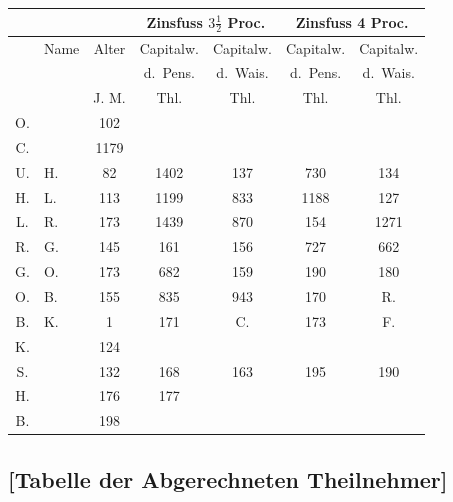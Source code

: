 \documentclass[12pt,a4paper]{article}
\begin{document}
\begin{center}
\begin{tabular}{|c|l|c|c|c|c|c|}
\hline
 & & & \multicolumn{2}{c|}{Zinsfuss $3\frac{1}{2}$ Proc.} & \multicolumn{2}{c|}{Zinsfuss 4 Proc.} \\
\hline
 & Name & Alter & Capitalw. & Capitalw. & Capitalw. & Capitalw. \\
 & & & d.~Pens. & d.~Wais. & d.~Pens. & d.~Wais. \\
 & & J. M. & Thl. & Thl. & Thl. & Thl. \\
\hline
O. & & 102 & & & & \\
C. & & 1179 & & & & \\
U. & H. & 82 & 1402 & 137 & 730 & 134 \\
H. & L. & 113 & 1199 & 833 & 1188 & 127 \\
L. & R. & 173 & 1439 & 870 & 154 & 1271 \\
R. & G. & 145 & 161 & 156 & 727 & 662 \\
G. & O. & 173 & 682 & 159 & 190 & 180 \\
O. & B. & 155 & 835 & 943 & 170 & R. \\
B. & K. & 1 & 171 & C. & 173 & F. \\
K. & & 124 & & & & \\
S. & & 132 & 168 & 163 & 195 & 190 \\
H. & & 176 & 177 & & & \\
B. & & 198 & & & & \\
\hline
\end{tabular}
\end{center}

\subsection*{[Tabelle der Abgerechneten Theilnehmer]}
\end{document}

